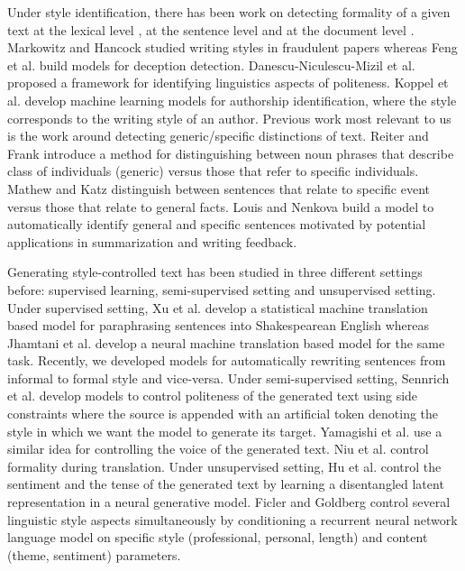 \documentclass[11pt,a4paper]{article}
\begin{document}
Under style identification, there has been work on detecting formality of a given text at the lexical level \cite{brooke2010automatic,lahiri2011informality,brooke2014supervised,pavlick2015inducing}, at the sentence level \cite{pavlick2016empirical} and at the document level \cite{sheikha2010automatic,peterson2011email,mosquera2012smile}. 
Markowitz and Hancock \cite{markowitz2016linguistic} studied writing styles in fraudulent papers whereas Feng et al. \cite{feng2012syntactic} build models for deception detection. 
Danescu-Niculescu-Mizil et al. \cite{danescu2013computational} proposed a framework for identifying linguistics aspects of politeness. 
Koppel et al. \cite{koppel2002automatically,koppel2009computational,koppel2011authorship} develop machine learning models for authorship identification, where the style corresponds to the writing style of an author. 
Previous work most relevant to us is the work around detecting generic/specific distinctions of text. Reiter and Frank \cite{reiter2010identifying} introduce a method for distinguishing between noun phrases that describe class of individuals (generic) versus those that refer to specific individuals. 
Mathew and Katz \cite{mathew2009supervised} distinguish between sentences that relate to specific event versus those that relate to general facts. 
Louis and Nenkova \cite{louis2011automatic} build a model to automatically identify general and specific sentences motivated by potential applications
in summarization and writing feedback.

Generating style-controlled text has been studied in three different settings before: supervised learning, semi-supervised setting and unsupervised setting.
Under supervised setting, Xu et al. \cite{xu2012paraphrasing} develop a statistical machine translation based model for paraphrasing sentences into Shakespearean English whereas 
Jhamtani et al. \cite{jhamtani2017shakespearizing} develop a neural machine translation based model for the same task. 
Recently, we \cite{RaoT18} developed models for automatically rewriting sentences from informal to formal style and vice-versa. 
Under semi-supervised setting,  Sennrich et al. \cite{sennrich2016controlling} develop models to control politeness of the generated text using side constraints where the source is appended with an artificial token denoting the style in which we want the model to generate its target. Yamagishi et al. \cite{yamagishi2016controlling} use a similar idea for controlling the voice of the generated text. 
Niu et al. \cite{niu2017study,niu2018multi} control formality during translation. 
Under unsupervised setting, Hu et al. \cite{hu2017toward} control the sentiment and the tense of the generated text by learning a disentangled latent representation in a neural generative model. 
Ficler and Goldberg \cite{ficler2017controlling} control several linguistic style aspects simultaneously by conditioning a recurrent neural network language model on specific style (professional, personal, length) and content (theme, sentiment) parameters. 
\end{document}
